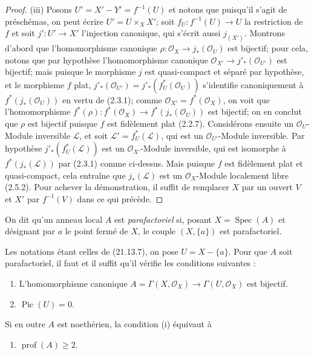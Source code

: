 \begin{proof}
(iii) Posons $U'=X'-Y'=f^{-1}(U)$ et notons que puisqu'il s'agit de préschémas, on
peut écrire $U'=U\times_X X'$; soit $f_U:f^{-1}(U)\to U$ la restriction de $f$ et
soit $j':U'\to X'$ l'injection canonique, qui s'écrit aussi $j_{(X')}$. Montrons
d'abord que l'homomorphisme canonique
$\rho:\mathcal O_X\to j_*(\mathcal O_U)$ est bijectif; pour cela, notons que par
hypothèse l'homomorphisme canonique
$\mathcal O_{X'}\to j'_*(\mathcal O_{U'})$ est bijectif; mais puisque le morphisme
$j$ est quasi-compact et séparé par hypothèse, et le morphisme $f$ plat,
$j'_*(\mathcal O_{U'})=j'_*(f_U^*(\mathcal O_U))$ s'identifie canoniquement à
$f^*(j_*(\mathcal O_U))$ en vertu de (2.3.1); comme
$\mathcal O_{X'}=f^*(\mathcal O_X)$, on voit que l'homomorphisme
$f^*(\rho):f^*(\mathcal O_X)\to f^*(j_*(\mathcal O_U))$ est bijectif; on en conclut
que $\rho$ est bijectif puisque $f$ est fidèlement plat (2.2.7). Considérons ensuite
un $\mathcal O_U$-Module inversible $\mathscr L$, et soit
$\mathscr L'=f_U^*(\mathscr L)$, qui est un $\mathcal O_{U'}$-Module inversible. Par
hypothèse $j'_*(f_U^*(\mathscr L))$ est un $\mathcal O_{X'}$-Module inversible, qui
est isomorphe à $f^*(j_*(\mathscr L))$ par (2.3.1) comme ci-dessus. Mais puisque $f$
est fidèlement plat et quasi-compact, cela entraîne que $j_*(\mathscr L)$ est un
$\mathcal O_X$-Module localement libre (2.5.2). Pour achever la démonstration, il
suffit de remplacer $X$ par un ouvert $V$ et $X'$ par $f^{-1}(V)$ dans ce qui
précède.
\end{proof}

\begin{definition}[21.13.7]
On dit qu'un anneau local $A$ est \emph{parafactoriel} si, posant
$X=\operatorname{Spec}(A)$ et désignant par $a$ le point fermé de $X$, le couple
$(X,\{a\})$ est parafactoriel.
\end{definition}

\begin{proposition}[21.13.8]
\label{IV.21.13.8}
Les notations étant celles de (21.13.7), on pose $U=X-\{a\}$. Pour que $A$ soit
parafactoriel, il faut et il suffit qu'il vérifie les conditions suivantes :
\begin{enumerate}[label=(\roman*)]
  \item L'homomorphisme canonique
  $A=\Gamma(X,\mathcal O_X)\to\Gamma(U,\mathcal O_X)$ est bijectif.
  \item $\operatorname{Pic}(U)=0$.
\end{enumerate}
Si en outre $A$ est noethérien, la condition (i) équivaut à
\begin{enumerate}
  \item[\textup{(i bis)}] $\operatorname{prof}(A)\geq2$.
\end{enumerate}
\end{proposition}

